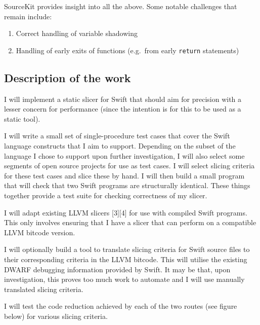 SourceKit provides insight into all the above. Some notable challenges
that remain include:

\begin{enumerate}
\def\labelenumi{\arabic{enumi}.}
\tightlist
\item
  Correct handling of variable shadowing
\item
  Handling of early exits of functions (e.g.~from early \texttt{return}
  statements)
\end{enumerate}

\subsection{Description of the work}\label{description-of-the-work}

I will implement a static slicer for Swift that should aim for precision
with a lesser concern for performance (since the intention is for this
to be used as a static tool).

I will write a small set of single-procedure test cases that cover the
Swift language constructs that I aim to support. Depending on the subset
of the language I chose to support upon further investigation, I will
also select some segments of open source projects for use as test cases.
I will select slicing criteria for these test cases and slice these by
hand. I will then build a small program that will check that two Swift
programs are structurally identical. These things together provide a
test suite for checking correctness of my slicer.

I will adapt existing LLVM slicers {[}3{]}{[}4{]} for use with compiled
Swift programs. This only involves ensuring that I have a slicer that
can perform on a compatible LLVM bitcode version.

I will optionally build a tool to translate slicing criteria for Swift
source files to their corresponding criteria in the LLVM bitcode. This
will utilise the existing DWARF debugging information provided by Swift.
It may be that, upon investigation, this proves too much work to
automate and I will use manually translated slicing criteria.

I will test the code reduction achieved by each of the two routes (see
figure below) for various slicing criteria.


